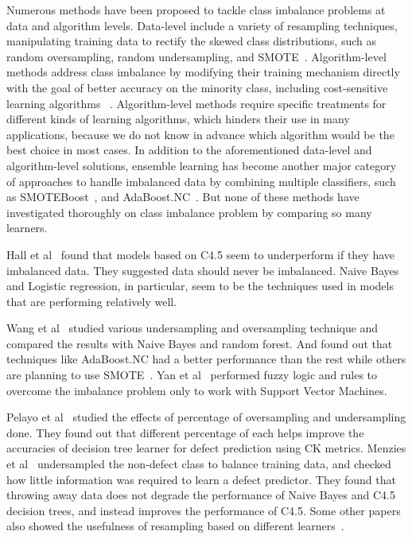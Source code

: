 \documentclass[conference]{IEEEtran}
\begin{document}
Numerous methods have been proposed to tackle class
imbalance problems at data and algorithm levels. Data-level include a variety of resampling techniques, manipulating training data to rectify the skewed class distributions, such as random oversampling, random undersampling, and SMOTE~\cite{estabrooks2004multiple}. Algorithm-level methods address class imbalance by
modifying their training mechanism directly with the 
goal of better accuracy on the minority class, including cost-sensitive learning algorithms ~\cite{he2009learning}.
Algorithm-level methods require specific treatments for different
kinds of learning algorithms, which hinders their use
in many applications, because we do not know in advance
which algorithm would be the best choice in most cases. In addition to the aforementioned data-level and algorithm-level solutions, ensemble learning has become another major category of approaches to handle imbalanced data by combining multiple classifiers, such as SMOTEBoost~\cite{chawla2003smoteboost}, and
AdaBoost.NC~\cite{wang2010negative}. But none of these methods have investigated thoroughly on class imbalance problem by comparing so many learners.

Hall et al~\cite{hall2012systematic} found that models based on C4.5 seem to underperform if they have imbalanced data. They suggested data should never be imbalanced. Naive Bayes and Logistic regression, in particular, seem to be the techniques used in models that are performing relatively well.

Wang et al~\cite{wang2013using} studied various undersampling and oversampling technique and compared the results with Naive Bayes and random forest. And found out that techniques like AdaBoost.NC had a better performance than the rest while others are planning to use SMOTE~\cite{gray2009using}. Yan et al~\cite{yan2010software} performed fuzzy logic and rules to overcome the imbalance problem only to work with Support Vector Machines. 

Pelayo et al~\cite{pelayo2007applying} studied the effects of percentage of oversampling and undersampling done. They found out that different percentage of each helps improve the accuracies of decision tree learner for defect prediction using CK metrics. Menzies et al~\cite{menzies2008implications} undersampled the non-defect class to balance training
data, and checked how little information was required to learn a defect predictor. They found that throwing away data does not degrade the performance of Naive Bayes and C4.5 decision trees, and instead improves the performance of C4.5. Some other papers also showed the usefulness of resampling based on different learners~\cite{pelayo2007applying, pelayo2012evaluating, riquelme2008finding}.
\end{document}
